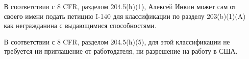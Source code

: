В соответствии с 8 CFR, разделом 204.5(h)(1),
Алексей Инкин может сам от своего имени подать петицию I-140 для классификации по
разделу 203(b)(1)(A) как негражданина с выдающимися способностями.

В соответствии с 8 CFR, разделом 204.5(h)(5),
для этой классификации не требуется ни приглашение от работодателя, ни разрешение на работу в США.

\pagebreak
